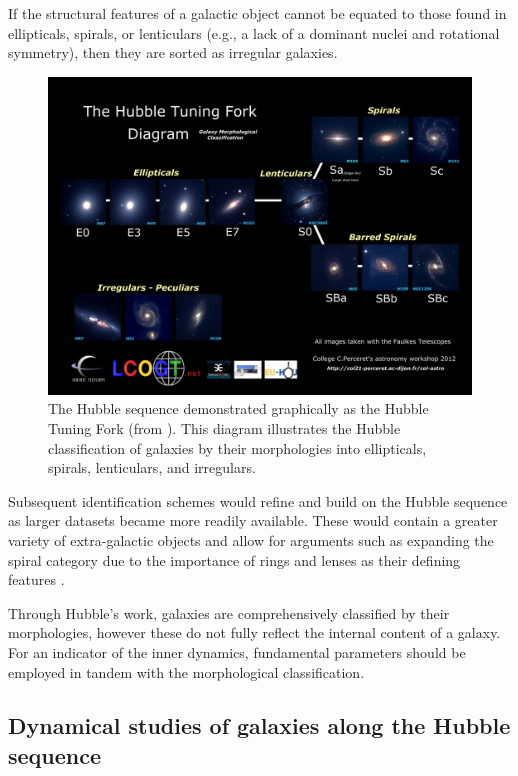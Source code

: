 \documentclass[12pt, twocolumn, nofootinbib]{revtex4-1}    %
\begin{document}
If the structural features of a galactic object cannot be equated to those found in ellipticals, spirals, or lenticulars (e.g., a lack of a dominant nuclei and rotational symmetry), then they are sorted as irregular galaxies.

\begin{figure}
\includegraphics[width=\textwidth]{introduction/hubble-tuning-fork-diagram}
\caption{The Hubble sequence demonstrated graphically as the Hubble Tuning Fork (from \citealt{hubble_tuning_fork}). This diagram illustrates the Hubble classification of galaxies by their morphologies into ellipticals, spirals, lenticulars, and irregulars.}
\label{fig:hubble_tuning_fork}
\end{figure}

Subsequent identification schemes would refine and build on the Hubble sequence as larger datasets became more readily available. These would contain a greater variety of extra-galactic objects and allow for arguments such as expanding the spiral category due to the importance of rings and lenses as their defining features \citep{1959HDP....53..275D}. 

Through Hubble's work, galaxies are comprehensively classified by their morphologies, however these do not fully reflect the internal content of a galaxy. For an indicator of the inner dynamics, fundamental parameters should be employed in tandem with the morphological classification. 

\vspace{2ex} %
\subsection{Dynamical studies of galaxies along the Hubble sequence}
\end{document}
